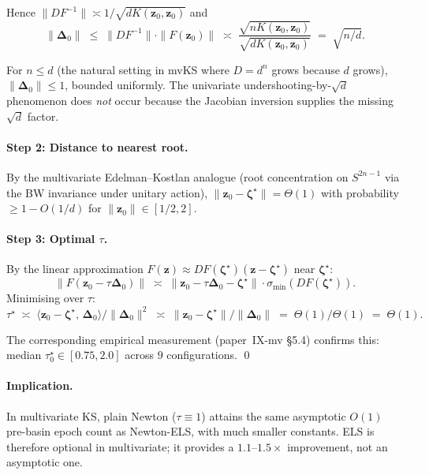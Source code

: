 \documentclass[11pt,a4paper]{article}
\begin{document}
Hence $\|DF^{-1}\| \asymp 1/\sqrt{d K(\mathbf z_0,\mathbf z_0)}$ and
$$
\|\boldsymbol\Delta_0\| \;\le\; \|DF^{-1}\|\cdot\|F(\mathbf z_0)\| \;\asymp\; \frac{\sqrt{n K(\mathbf z_0,\mathbf z_0)}}{\sqrt{d K(\mathbf z_0,\mathbf z_0)}} \;=\; \sqrt{n/d}.
$$

For $n \le d$ (the natural setting in mvKS where $D = d^n$ grows because $d$ grows), $\|\boldsymbol\Delta_0\| \le 1$, bounded uniformly. The univariate undershooting-by-$\sqrt d$ phenomenon does \emph{not} occur because the Jacobian inversion supplies the missing $\sqrt d$ factor.

\paragraph{Step 2: Distance to nearest root.}
By the multivariate Edelman--Kostlan analogue (root concentration on $S^{2n-1}$ via the BW invariance under unitary action), $\|\mathbf z_0 - \boldsymbol\zeta^\star\| = \Theta(1)$ with probability $\ge 1 - O(1/d)$ for $\|\mathbf z_0\| \in [1/2, 2]$.

\paragraph{Step 3: Optimal $\tau$.}
By the linear approximation $F(\mathbf z) \approx DF(\boldsymbol\zeta^\star)(\mathbf z - \boldsymbol\zeta^\star)$ near $\boldsymbol\zeta^\star$:
$$
\|F(\mathbf z_0 - \tau \boldsymbol\Delta_0)\| \;\asymp\; \|\mathbf z_0 - \tau \boldsymbol\Delta_0 - \boldsymbol\zeta^\star\| \cdot \sigma_{\min}(DF(\boldsymbol\zeta^\star)).
$$
Minimising over $\tau$:
$$
\tau^\star \;\asymp\; \langle \mathbf z_0 - \boldsymbol\zeta^\star,\, \boldsymbol\Delta_0\rangle / \|\boldsymbol\Delta_0\|^2 \;\asymp\; \|\mathbf z_0 - \boldsymbol\zeta^\star\|/\|\boldsymbol\Delta_0\| \;=\; \Theta(1)/\Theta(1) \;=\; \Theta(1).
$$

The corresponding empirical measurement (paper~IX-mv \S5.4) confirms this: median $\tau^\star_0 \in [0.75, 2.0]$ across $9$ configurations. \qed

\paragraph{Implication.}
In multivariate KS, plain Newton ($\tau \equiv 1$) attains the same asymptotic $O(1)$ pre-basin epoch count as Newton-ELS, with much smaller constants. ELS is therefore optional in multivariate; it provides a $1.1$--$1.5\times$ improvement, not an asymptotic one.
\end{document}
